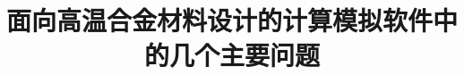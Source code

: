 
\title{面向高温合金材料设计的计算模拟软件中的几个主要问题}
\author[ ]{}   %
\renewcommand*{\Authfont}{\small\rm} %
\renewcommand*{\Affilfont}{\small\it} %
\renewcommand\Authands{ and } %
\renewcommand\Authands{ , } %
\date{} %


\maketitle

